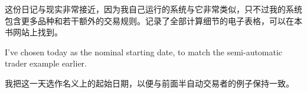 \begin{chineseblock}这份日记与现实非常接近，因为我自己运行的系统与它非常类似，只不过我的系统包含更多品种和若干额外的交易规则。记录了全部计算细节的电子表格，可以在本书网站上找到。\end{chineseblock}


\begin{englishblock} I've chosen today as the nominal starting date, to match the semi-automatic trader example earlier. \end{englishblock}

\begin{chineseblock}我把这一天选作名义上的起始日期，以便与前面半自动交易者的例子保持一致。\end{chineseblock}

